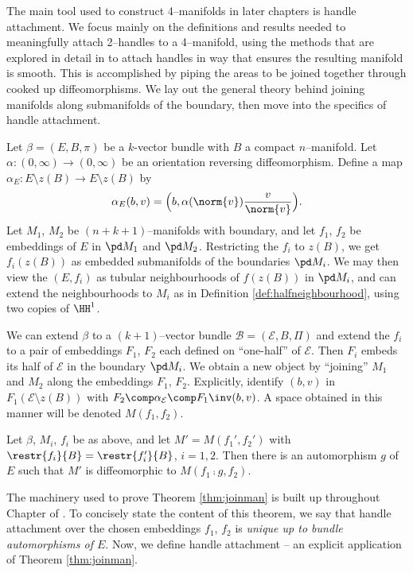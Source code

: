 The main tool used to construct 4--manifolds in later chapters is handle attachment.
We focus mainly on the definitions and results needed to meaningfully attach 2--handles to a 4--manifold, using the methods that are explored in detail in \cite{Kosi93} to attach handles in way that ensures the resulting manifold is smooth.
This is accomplished by piping the areas to be joined together through cooked up diffeomorphisms.
We lay out the general theory behind joining manifolds along submanifolds of the boundary, then move into the specifics of handle attachment.

Let $\beta=(E,B,\pi)$ be a $k$-vector bundle with $B$ a compact $n$--manifold.
Let $\alpha:(0,\infty)\to(0,\infty)$ be an orientation reversing diffeomorphism.
Define a map $\alpha_E: E\setminus z(B) \to E\setminus z(B)$ by
\begin{equation}
\label{eqn:alpha}
\alpha_E(b,v) = \Big(b,\alpha(\norm{v})\frac{v}{\norm{v}}\Big).
\end{equation}
Let $M_1$, $M_2$ be $(n+k+1)$--manifolds with boundary, and let $f_1$, $f_2$ be embeddings of $E$ in $\pd M_1$ and $\pd M_2$.
Restricting the $f_i$ to $z(B)$, we get $f_i(z(B))$ as embedded submanifolds of the boundaries $\pd M_i$.
We may then view the $(E,f_i)$ as tubular neighbourhoods of $f(z(B))$ in $\pd M_i$, and can extend the neighbourhoods to $M_i$ as in Definition \ref{def:halfneighbourhood}, using two copies of $\HH^1$.

We can extend $\beta$ to a $(k+1)$--vector bundle $\mathcal{B}=(\mathcal{E},B,\Pi)$ and extend the $f_i$ to a pair of embeddings $F_1$, $F_2$ each defined on ``one-half'' of $\mathcal{E}$.
Then $F_i$ embeds its half of $\mathcal{E}$ in the boundary $\pd M_i$.
We obtain a new object by ``joining'' $M_1$ and $M_2$ along the embeddings $F_1$, $F_2$.
Explicitly, identify $(b,v)$ in $F_1(\mathcal{E}\setminus z(B))$ with $F_2\comp \alpha_\mathcal{E}\comp F_1\inv(b,v)$.
A space obtained in this manner will be denoted $M(f_1,f_2)$.

\begin{theorem}
	\label{thm:joinman}
	Let $\beta$, $M_i$, $f_i$ be as above, and let $M'=M(f_1',f_2')$ with $\restr{f_i}{B}=\restr{f_i'}{B}$, $i=1,2$.
	Then there is an automorphism $g$ of $E$ such that $M'$ is diffeomorphic to $M(f_1\comp g,f_2)$.
\end{theorem}

The machinery used to prove Theorem \ref{thm:joinman} is built up throughout Chapter  of \cite{Kosi93}.
To concisely state the content of this theorem, we say that handle attachment over the chosen embeddings $f_1$, $f_2$ is \emph{unique up to bundle automorphisms of $E$}.
Now, we define handle attachment -- an explicit application of Theorem \ref{thm:joinman}.

